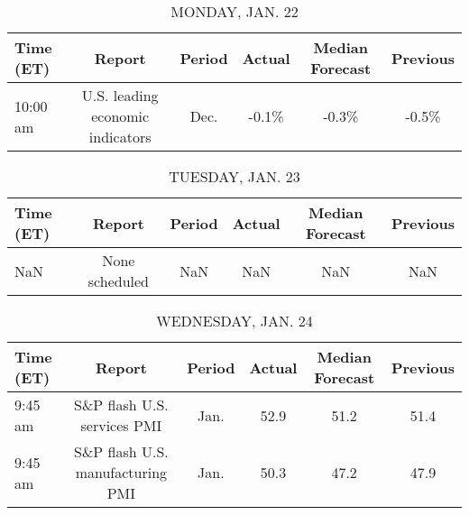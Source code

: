 \documentclass{article}%
\begin{document}
%
\normalsize%


\begin{table}[htbp]%
\caption{MONDAY, JAN. 22}%
\centering%
\begin{adjustbox}{width=1\textwidth}%
\begin{tabular}{lccccc}
\toprule
Time (ET) &                           Report & Period & Actual & Median Forecast & Previous \\
\midrule
 10:00 am & U.S. leading economic indicators &   Dec. &  -0.1\% &           -0.3\% &    -0.5\% \\
\bottomrule
\end{tabular}
%
\end{adjustbox}%
\end{table}

%


\begin{table}[htbp]%
\caption{TUESDAY, JAN. 23}%
\centering%
\begin{adjustbox}{width=1\textwidth}%
\begin{tabular}{lccccc}
\toprule
Time (ET) &         Report & Period & Actual & Median Forecast & Previous \\
\midrule
      NaN & None scheduled &    NaN &    NaN &             NaN &      NaN \\
\bottomrule
\end{tabular}
%
\end{adjustbox}%
\end{table}

%


\begin{table}[htbp]%
\caption{WEDNESDAY, JAN. 24}%
\centering%
\begin{adjustbox}{width=1\textwidth}%
\begin{tabular}{lccccc}
\toprule
Time (ET) &                           Report & Period & Actual & Median Forecast & Previous \\
\midrule
  9:45 am &      S\&P flash U.S. services PMI &   Jan. &   52.9 &            51.2 &     51.4 \\
  9:45 am & S\&P flash U.S. manufacturing PMI &   Jan. &   50.3 &            47.2 &     47.9 \\
\bottomrule
\end{tabular}
%
\end{adjustbox}%
\end{table}

%
\end{document}
